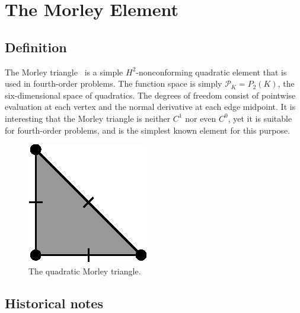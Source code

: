 
\newpage

\section{The Morley Element}

\subsection{Definition}

The Morley triangle~\cite{Morley1968} is a simple \( H^2
\)-nonconforming quadratic element that is used in fourth-order
problems.  The function space is simply \( \mathcal{P}_K = P_2(K) \),
the six-dimensional space of quadratics.  The degrees of freedom
consist of pointwise evaluation at each vertex and the normal
derivative at each edge midpoint. It is interesting that the Morley
triangle is neither \( C^1 \) nor even \( C^0 \), yet it is suitable
for fourth-order problems, and is the simplest known element for this
purpose.

\begin{figure}[H]
  \begin{center}
    \includegraphics[width=\elementwidth]{chapters/kirby-6/eps/MOR2.eps}
    \caption{The quadratic Morley triangle.}
  \end{center}
\end{figure}

\subsection{Historical notes}

